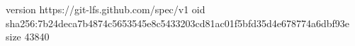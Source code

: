 version https://git-lfs.github.com/spec/v1
oid sha256:7b24deca7b4874c5653545e8c5433203cd81ac01f5bfd35d4e678774a6dbf93e
size 43840

